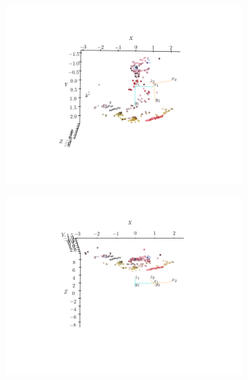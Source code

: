 \begin{homeworkProblem}
  \begin{figure}[H]
      \raggedright
      \begin{subfigure}{0.49\textwidth}
          \includegraphics[width=1.3\linewidth]{images/ang_1.png}
      \end{subfigure}
      \begin{subfigure}{0.49\textwidth}
          \includegraphics[width=1.3\linewidth]{images/ang_2.png}
      \end{subfigure}
  \end{figure}
  \begin{figure}[H]
      \raggedright
      \begin{subfigure}{0.49\textwidth}

\end{subfigure}
\end{figure}
\end{homeworkProblem}
